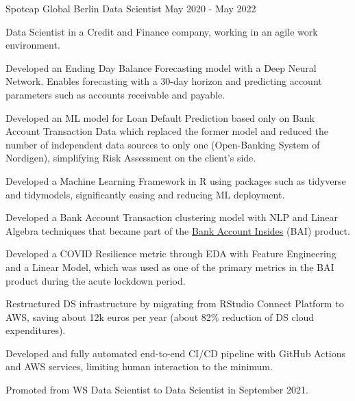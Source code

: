 

\begin{cventries}

  \cventry
    {Spotcap Global}
    {Berlin}
    {Data Scientist}
    {May 2020 - May 2022}
    {
      \begin{cvitems}
        \item{Data Scientist in a Credit and Finance company, working in an agile work environment.}
        \item{Developed an Ending Day Balance Forecasting model with a Deep Neural Network. Enables forecasting with a 30-day horizon and predicting account parameters such as accounts receivable and payable.}
        \item{Developed an ML model for Loan Default Prediction based only on Bank Account Transaction Data which replaced the former model and reduced the number of independent data sources to only one (Open-Banking System of Nordigen), simplifying Risk Assessment on the client's side.}
        \item{Developed a Machine Learning Framework in R using packages such as tidyverse and tidymodels, significantly easing and reducing ML deployment.}
        \item{Developed a Bank Account Transaction clustering model with NLP and Linear Algebra techniques that became part of the \href{https://www.spotcap.com/bank-account-insights/}{Bank Account Insides} (BAI) product.}
        \item{Developed a COVID Resilience metric through EDA with Feature Engineering and a Linear Model, which was used as one of the primary metrics in the BAI product during the acute lockdown period.}
        \item{Restructured DS infrastructure by migrating from RStudio Connect Platform to AWS, saving about 12k euros per year (about 82\% reduction of DS cloud expenditures).}
        \item{Developed and fully automated end-to-end CI/CD pipeline with GitHub Actions and AWS services, limiting human interaction to the minimum.}
        \item{Promoted from WS Data Scientist to Data Scientist in September 2021.}
      \end{cvitems}
    }


\end{cventries}
